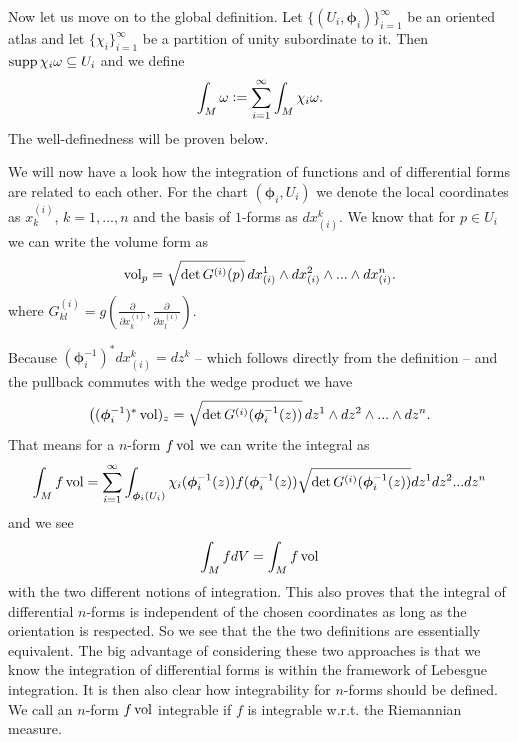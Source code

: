 \documentclass[../master_thesis.tex]{subfiles}
\begin{document}
Now let us move on to the global definition. Let $\{(U_i,\boldsymbol{\phi}_i)\}_{i=1}^\infty$
be an oriented atlas and let $\{ \chi_i \}_{i=1}^\infty$ be a partition 
of unity subordinate to it. 
Then $\operatorname{supp} \chi_i \omega \subseteq U_i$ 
and we define 
\begin{align*}
    \int_M \omega \vcentcolon= \sum_{i=1}^\infty \int_M \chi_i \omega.
\end{align*} 
The well-definedness will be proven below.

We will now have a look how the integration of functions and of 
differential forms are related to each other. 
For the chart $(\boldsymbol{\phi}_i, U_i)$ we denote the local coordinates as 
$x^{(i)}_k$, $k=1,...,n$ and the basis of $1$-forms as $dx_{(i)}^k$.
We know that for $p \in U_i$ we can write the volume form as
\begin{align*}
    \operatorname{vol}_p = \sqrt{ \det G^{(i)}(p)} \,
        dx_{(i)}^1 \wedge dx_{(i)}^2 \wedge ... \wedge dx_{(i)}^n.
\end{align*}
where $G^{(i)}_{kl} = g(\frac{\partial}{\partial x^{(i)}_k},\frac{\partial}{\partial x^{(i)}_l} )$.

Because $(\boldsymbol{\phi}_i^{-1})^* dx_{(i)}^k = dz^k$ -- which follows directly from the 
definition -- and the pullback commutes with the wedge product we have
\begin{align*}
    \big( (\boldsymbol{\phi}_i^{-1})^* \operatorname{vol})_z =  
        \sqrt{ \det G^{(i)}(\boldsymbol{\phi}_i^{-1}(z))} \,
        dz^1 \wedge dz^2 \wedge ... \wedge dz^n.
\end{align*}
That means for a $n$-form $f \operatorname{vol}$ we can write the integral as
\begin{align*}
    \int_M f \operatorname{vol} = \sum_{i=1}^\infty \int_{\boldsymbol{\phi}_i(U_i)} 
    \chi_i(\boldsymbol{\phi}_i^{-1}(z)) f(\boldsymbol{\phi}_i^{-1}(z))
        \sqrt{ \det G^{(i)}(\boldsymbol{\phi}_i^{-1}(z))} dz^1 dz^2 ... dz^n
\end{align*} 
and we see 
\begin{align*}
    \int_M f dV = \int_M f \operatorname{vol}
\end{align*}
with the two different notions of integration. This also proves that 
the integral of differential $n$-forms is independent of the chosen 
coordinates as long as the orientation is respected. So we see that the
the two definitions are essentially equivalent.
The big advantage of considering these two
approaches is that we know the integration of 
differential forms is within the framework of Lebesgue integration. 
It is then also 
clear how integrability for $n$-forms should be defined. We call an 
$n$-form $f \operatorname{vol}$ integrable if $f$ is integrable w.r.t. the Riemannian measure.
\end{document}
